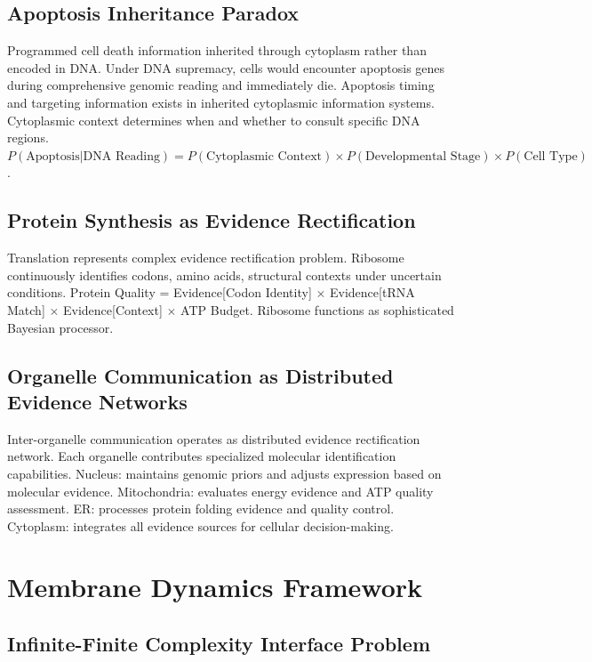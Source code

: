 \documentclass[12pt,a4paper]{article}
\begin{document}
\subsection{Apoptosis Inheritance Paradox}

Programmed cell death information inherited through cytoplasm rather than encoded in DNA. Under DNA supremacy, cells would encounter apoptosis genes during comprehensive genomic reading and immediately die. Apoptosis timing and targeting information exists in inherited cytoplasmic information systems. Cytoplasmic context determines when and whether to consult specific DNA regions. $P(\text{Apoptosis}|\text{DNA Reading}) = P(\text{Cytoplasmic Context}) \times P(\text{Developmental Stage}) \times P(\text{Cell Type})$.

\subsection{Protein Synthesis as Evidence Rectification}

Translation represents complex evidence rectification problem. Ribosome continuously identifies codons, amino acids, structural contexts under uncertain conditions. Protein Quality = Evidence[Codon Identity] $\times$ Evidence[tRNA Match] $\times$ Evidence[Context] $\times$ ATP Budget. Ribosome functions as sophisticated Bayesian processor.

\subsection{Organelle Communication as Distributed Evidence Networks}

Inter-organelle communication operates as distributed evidence rectification network. Each organelle contributes specialized molecular identification capabilities. Nucleus: maintains genomic priors and adjusts expression based on molecular evidence. Mitochondria: evaluates energy evidence and ATP quality assessment. ER: processes protein folding evidence and quality control. Cytoplasm: integrates all evidence sources for cellular decision-making.

\section{Membrane Dynamics Framework}

\subsection{Infinite-Finite Complexity Interface Problem}
\end{document}
